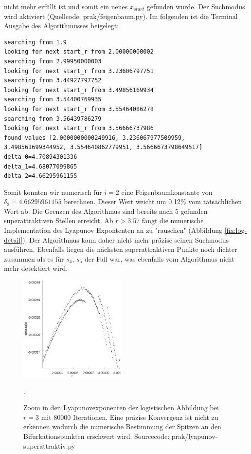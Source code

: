 \documentclass{scrartcl}
\begin{document}
nicht mehr erfüllt ist und somit ein neues $x_{start}$ gefunden wurde. Der Suchmodus wird aktiviert  (Quellcode: prak/feigenbaum.py).
Im folgenden ist die Terminal Ausgabe des Algorithmusses beigelegt:
\begin{lstlisting}
searching from 1.9
looking for next start_r from 2.00000000002
searching from 2.99950000003
looking for next start_r from 3.23606797751
searching from 3.44927797752
looking for next start_r from 3.49856169934
searching from 3.54400769935
looking for next start_r from 3.55464086278
searching from 3.56439786279
looking for next start_r from 3.56666737986
found values [2.0000000000249916, 3.236067977509959, 3.498561699344952, 3.554640862779951, 3.5666673798649517]
delta_0=4.70894301336
delta_1=4.68077099865
delta_2=4.66295961155
\end{lstlisting}
Somit konnten wir numerisch für $i=2$ eine Feigenbaumkonstante von $\delta_2=4.66295961155$ berechnen. Dieser Wert weicht um 0.12\% vom tatsächlichen Wert ab. Die Grenzen des Algorithmus sind bereits nach 5 gefunden superattraktiven Stellen erreicht. Ab $r>3.57$ fängt die numerische Implementation des Lyapunov Expontenten an zu "rauschen" (Abbildung \ref{fix:log-detail}). Der Algorithmus kann daher nicht mehr präzise seinen Suchmodus ausführen. Ebenfalls liegen die nächsten superattraktiven Punkte noch dichter zusammen als es für $s_4$, $s_5$ der Fall war, was ebenfalls vom Algorithmus nicht mehr detektiert wird. 
\begin{figure}
\centering
\includegraphics[height=200px]{lya-rauschen}
\caption{Zoom in den Lyapunovexponenten der logistischen Abbildung bei $r=3$ mit 80000 Iterationen. 
Eine präzise Konvergenz ist nicht zu erkennen wodurch die numerische Bestimmung der Spitzen an den Bifurkationspunkten erschwert wird. Sourcecode: prak/lyapunov-superattraktiv.py}. 
\label{fig:lya-rauschen}
\end{figure}
\end{document}
